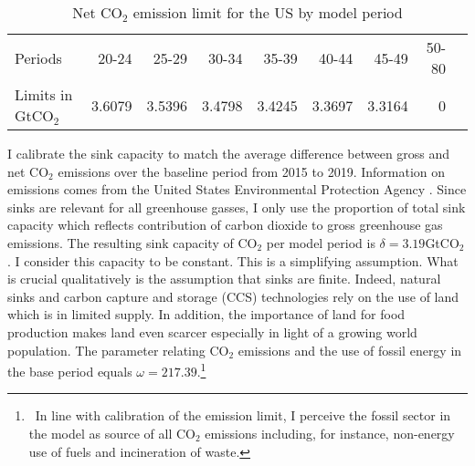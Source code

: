  \begin{table}[hh!!!!!]
	\begin{center}
		\captionsetup{width=0.9\textwidth}
		\caption{Net CO$_2$ emission limit for the US by model period}
		\label{tab:emlimit}
		\begin{tabular}{l|rrrrrrrr}
			\hline 
			\hline
			Periods&20-24&25-29&30-34&35-39&40-44&45-49&50-80\\
			Limits in GtCO$_2$&3.6079&3.5396&3.4798&3.4245&3.3697&3.3164&0\\
			\hline \hline
		 			
	\end{tabular}
\end{center}
\end{table}	
 I calibrate the sink capacity to match the average difference between gross and net CO$_2$ emissions over the baseline period from 2015 to 2019. Information on emissions comes from the United States Environmental Protection Agency \citep{EPAems}. Since sinks are relevant for all greenhouse gasses, I only use the proportion of total sink capacity which reflects contribution of carbon dioxide to gross greenhouse gas emissions. The resulting sink capacity of CO$_2$ per model period is $\delta=3.19$GtCO$_2$.  I consider this capacity to be constant. This is a simplifying assumption. What is crucial qualitatively is the assumption that sinks are finite. Indeed, natural sinks and carbon capture and storage (CCS) technologies rely on the use of land \citep{VanVuuren2018AlternativeTechnologies} which is in limited supply. In addition, the importance of land for food production makes land even scarcer especially in light of a growing world population.
 The parameter relating CO$_2$ emissions and the use of fossil energy in the base period equals $\omega=217.39$.\footnote{\  In line with calibration of the emission limit, I perceive the fossil sector in the model as source of all CO$_2$ emissions including, for instance, non-energy use of fuels and incineration of waste.}  
 
